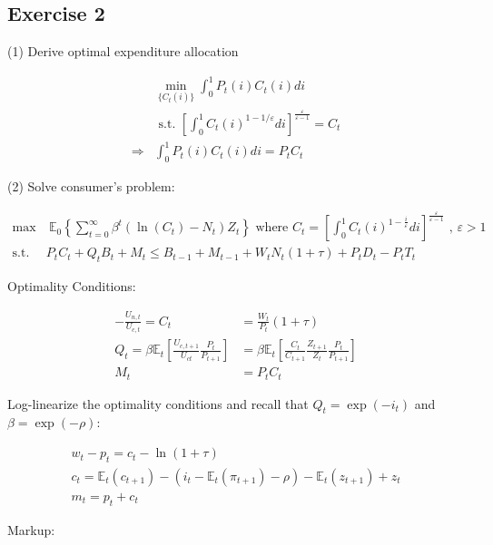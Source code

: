 {
\subsection*{Exercise 2}

\begin{enumerate}[label=(\alph*)]
{\item 
(1) Derive optimal expenditure allocation

$$
\begin{aligned}
& \min _{\{C_t(i)\}} \int_{0}^{1} P_{t}(i) C_{t}(i) d i \\
& \text { s.t. }\left[\int_{0}^{1} C_{t}(i)^{1-1 / \varepsilon} d i\right]^{\frac{\varepsilon}{\varepsilon-1}}=C_{t} \\
\Rightarrow &\int_{0}^{1} P_{t}(i) C_{t}(i) d i=P_{t} C_{t}
\end{aligned}
$$

(2) Solve consumer's problem:

\begin{align*}
    \max &\:\mathbb{E}_{0}\left\{\sum_{t=0}^{\infty} \beta^{t}\left(\ln \left(C_{t}\right)-N_{t}\right) Z_{t}\right\}
    \text{ where } C_{t} = \left[ \int_{0}^{1} C_{t}(i)^{1-\frac{i}{\varepsilon}} d i \right]^{ \frac{\varepsilon}{\varepsilon-1} } 
    \text{ , } \varepsilon>1 \\
    \text{s.t. } & P_{t} C_{t}+Q_{t} B_{t}+M_{t} \leq B_{t-1}+M_{t-1}+W_{t} N_{t}(1+\tau)+P_{t} D_{t}-P_{t} T_{t}
\end{align*}

Optimality Conditions:

$$
\begin{aligned}
-\frac{U_{n, t}}{U_{c, t}}=C_{t} & =\frac{W_{t}}{P_{t}}(1+\tau) \\
Q_{t}=\beta \mathbb{E}_{t}\left[\frac{U_{c, t+1}}{U_{c t}} \frac{P_{t}}{P_{t+1}}\right] & =\beta \mathbb{E}_{t}\left[\frac{C_{t}}{C_{t+1}} \frac{Z_{t+1}}{Z_{t}} \frac{P_{t}}{P_{t+1}}\right] \\
M_{t} & =P_{t} C_{t}
\end{aligned}
$$

Log-linearize the optimality conditions and recall that $Q_{t}=\exp \left(-i_{t}\right)$ and $\beta=\exp (-\rho)$:

$$
\begin{gathered}
w_{t}-p_{t}=c_{t}-\ln (1+\tau) \\
c_{t}=\mathbb{E}_{t}\left(c_{t+1}\right)-\left(i_{t}-\mathbb{E}_{t}\left(\pi_{t+1}\right)-\rho\right)-\mathbb{E}_{t}\left(z_{t+1}\right)+z_{t} \\
m_{t}=p_{t}+c_{t}
\end{gathered}
$$
}
{
\item 
Markup:

}
\end{enumerate}}
